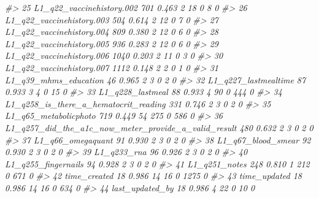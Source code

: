 \documentclass[]{article}
\newenvironment{Shaded}{\begin{snugshade}}{\end{snugshade}}
\newcommand{\CommentTok}[1]{\textcolor[rgb]{0.56,0.35,0.01}{\textit{#1}}}
\begin{document}
\begin{Shaded}
\begin{Highlighting}[]
\CommentTok{#> 25 L1_q22_vaccinehistory.002                                    701       0.463     2  18     0        8          0}
\CommentTok{#> 26 L1_q22_vaccinehistory.003                                    504       0.614     2  12     0        7          0}
\CommentTok{#> 27 L1_q22_vaccinehistory.004                                    809       0.380     2  12     0        6          0}
\CommentTok{#> 28 L1_q22_vaccinehistory.005                                    936       0.283     2  12     0        6          0}
\CommentTok{#> 29 L1_q22_vaccinehistory.006                                   1040       0.203     2  11     0        3          0}
\CommentTok{#> 30 L1_q22_vaccinehistory.007                                   1112       0.148     2   2     0        1          0}
\CommentTok{#> 31 L1_q39_mhms_education                                         46       0.965     2   3     0        2          0}
\CommentTok{#> 32 L1_q227_lastmealtime                                          87       0.933     3   4     0       15          0}
\CommentTok{#> 33 L1_q228_lastmeal                                              88       0.933     4  90     0      444          0}
\CommentTok{#> 34 L1_q258_is_there_a_hematocrit_reading                        331       0.746     2   3     0        2          0}
\CommentTok{#> 35 L1_q65_metabolicphoto                                        719       0.449    54 275     0      586          0}
\CommentTok{#> 36 L1_q257_did_the_a1c_now_meter_provide_a_valid_result         480       0.632     2   3     0        2          0}
\CommentTok{#> 37 L1_q66_omegaquant                                             91       0.930     2   3     0        2          0}
\CommentTok{#> 38 L1_q67_blood_smear                                            92       0.930     2   3     0        2          0}
\CommentTok{#> 39 L1_q233_rna                                                   96       0.926     2   3     0        2          0}
\CommentTok{#> 40 L1_q255_fingernails                                           94       0.928     2   3     0        2          0}
\CommentTok{#> 41 L1_q251_notes                                                248       0.810     1 212     0      671          0}
\CommentTok{#> 42 time_created                                                  18       0.986    14  16     0     1275          0}
\CommentTok{#> 43 time_updated                                                  18       0.986    14  16     0      634          0}
\CommentTok{#> 44 last_updated_by                                               18       0.986     4  22     0       10          0}

\end{Highlighting}
\end{Shaded}
\end{document}
